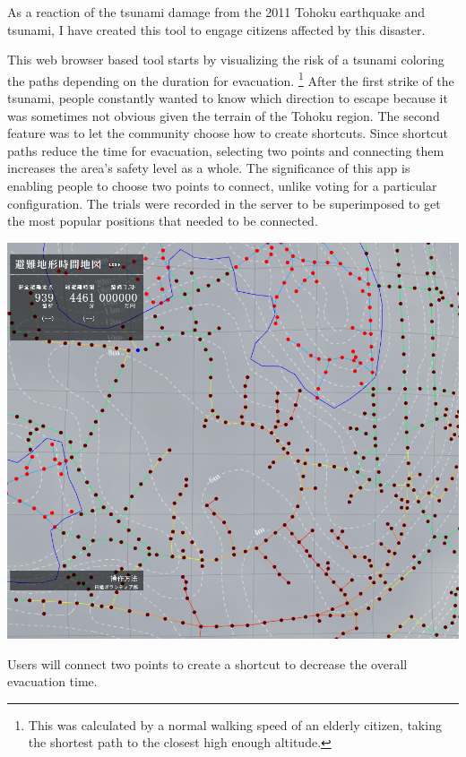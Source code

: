 As a reaction of the tsunami damage from the 2011 Tohoku earthquake and tsunami, I have created this tool to engage citizens affected by this disaster.

This web browser based tool starts by visualizing the risk of a tsunami coloring the paths depending on the duration for evacuation.
\footnote{This was calculated by a normal walking speed of an elderly citizen, taking the shortest path to the closest high enough altitude.}
After the first strike of the tsunami, people constantly wanted to know which direction to escape because it was sometimes not obvious given the  terrain of the Tohoku region. The second feature was to let the community choose how to create shortcuts. Since shortcut paths reduce the time for evacuation, selecting two points and connecting them increases the area’s safety level as a whole. The significance of this app is enabling people to choose two points to connect, unlike voting for a particular configuration. The trials were recorded in the server to be superimposed to get the most popular positions that needed to be connected.

\begin{marginfigure}[{0cm}]
  \includegraphics[width=\textwidth]{chapters/3/fig/nigechizu001.png}               
  \caption[zoom in nigechizu interface]{Users will connect two points to create a shortcut to decrease the overall evacuation time.}
  \label{fig:nigechizu}
\end{marginfigure}

